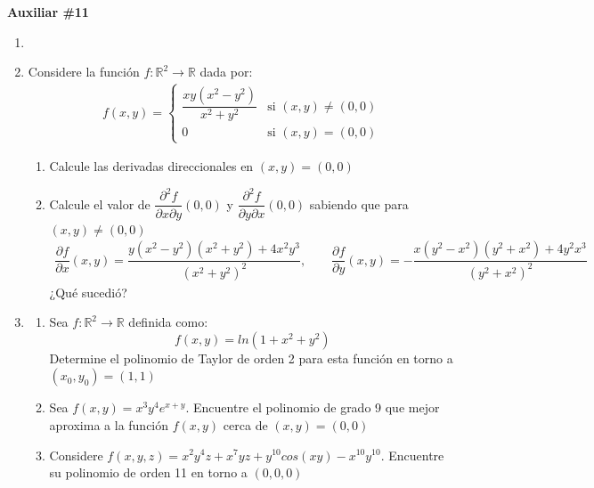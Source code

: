 \documentclass[letterpaper,11pt]{article}
\begin{document}
\begin{center}
	\LARGE \bf{Auxiliar \#11 }\\
\end{center}

\vspace{-1cm}
\begin{enumerate}\setlength{\itemsep}{0.4cm}	
\item[]

\item Considere la función $f:\mathbb{R}^2\rightarrow\mathbb{R}$ dada por:
\begin{align*}
    f(x,y)=\left\{
    \begin{matrix}
    \dfrac{xy(x^2-y^2)}{x^2+y^2}& \text{si } (x,y)\neq(0,0)\\
    0 & \text{si } (x,y)=(0,0)
    \end{matrix}\right. 
\end{align*}

\begin{enumerate}
    \item Calcule las derivadas direccionales en $(x,y)=(0,0)$
    \item Calcule el valor de $\dfrac{\partial^2 f}{\partial x\partial y}(0,0)$ y $\dfrac{\partial^2f}{\partial y\partial x}(0,0)$ sabiendo que para $(x,y)\neq(0,0)$
\begin{align*}
    \dfrac{\partial f}{\partial x}(x,y)=\dfrac{y(x^2-y^2)(x^2+y^2)+4x^2y^3}{(x^2+y^2)^2}, \qquad \dfrac{\partial f}{\partial y}(x,y)=-\dfrac{x(y^2-x^2)(y^2+x^2)+4y^2x^3}{(y^2+x^2)^2}
\end{align*}
¿Qué sucedió?
\end{enumerate}


\item 
\begin{enumerate}
    \item Sea $f:\mathbb{R}^2\rightarrow \mathbb{R}$ definida como:
    \[f(x,y)=ln(1+x^2+y^2)\]
    Determine el polinomio de Taylor de orden 2 para esta función en torno a $(x_0,y_0)=(1,1)$
    \item Sea $f(x,y)=x^3y^4e^{x+y}$. Encuentre el polinomio de grado 9 que mejor aproxima a la función $f(x,y)$ cerca de $(x,y)=(0,0)$
    \item Considere $f(x,y,z)=x^2y^4z+x^7yz+y^{10}cos(xy)-x^{10}y^{10}$. Encuentre su polinomio de orden 11 en torno a $(0,0,0)$
\end{enumerate}


\end{enumerate}
\end{document}
